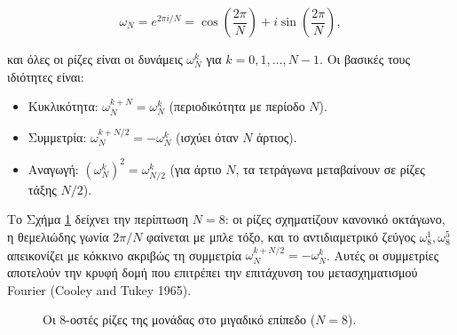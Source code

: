 \[
\omega_N = e^{2\pi i / N} = \cos\left(\frac{2\pi}{N}\right) + i \sin\left(\frac{2\pi}{N}\right),
\]

και όλες οι ρίζες είναι οι δυνάμεις \(\omega_N^k\) για
\(k = 0,1,\dots,N-1\). Οι βασικές τους ιδιότητες είναι:

\begin{itemize}
\tightlist
\item
  Κυκλικότητα: \(\omega_N^{k+N} = \omega_N^k\) (περιοδικότητα με περίοδο
  \(N\)).
\item
  Συμμετρία: \(\omega_N^{k+N/2} = -\omega_N^k\) (ισχύει όταν \(N\)
  άρτιος).
\item
  Αναγωγή: \((\omega_N^k)^2 = \omega_{N/2}^k\) (για άρτιο \(N\), τα
  τετράγωνα μεταβαίνουν σε ρίζες τάξης \(N/2\)).
\end{itemize}

Το Σχήμα \ref{fig:roots_of_unity} δείχνει την περίπτωση \(N=8\): οι
ρίζες σχηματίζουν κανονικό οκτάγωνο, η θεμελιώδης γωνία \(2\pi/N\)
φαίνεται με μπλε τόξο, και το αντιδιαμετρικό ζεύγος
\(\omega_8^1,\omega_8^5\) απεικονίζει με κόκκινο ακριβώς τη συμμετρία
\(\omega_N^{k+N/2}=-\omega_N^k\). Αυτές οι συμμετρίες αποτελούν την
κρυφή δομή που επιτρέπει την επιτάχυνση του μετασχηματισμού Fourier
(Cooley and Tukey 1965).

\begin{figure}[htbp]
\centering
{}
\caption{Οι $8$-οστές ρίζες της μονάδας στο μιγαδικό επίπεδο ($N=8$).}
\label{fig:roots_of_unity}
\end{figure}


